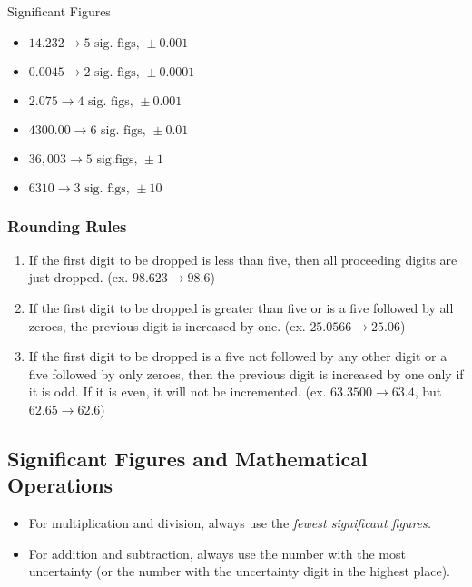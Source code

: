\noindent
{}

\begin{example}
Significant Figures
\begin{itemize}
	\item $14.232 \rightarrow 5 \text{ sig. figs, } \pm 0.001$
	\item $0.0045 \rightarrow 2 \text{ sig. figs, } \pm 0.0001$
	\item $2.075 \rightarrow 4 \text{ sig. figs, } \pm 0.001$
	\item $4300.00 \rightarrow 6 \text{ sig. figs, } \pm 0.01$
	\item $36,003 \rightarrow 5 \text{ sig.figs, } \pm 1$
	\item $6310 \rightarrow 3 \text{ sig. figs, } \pm 10$
\end{itemize}
\end{example}

\subsubsection{Rounding Rules}

\begin{enumerate}
	\item If the first digit to be dropped is less than five, then all proceeding digits are just dropped. (ex. $98.623 \rightarrow 98.6$)
	\item If the first digit to be dropped is greater than five or is a five followed by all zeroes, the previous digit is increased by one. (ex. $25.0566 \rightarrow 25.06$)
	\item If the first digit to be dropped is a five not followed by any other digit or a five followed by only zeroes, then the previous digit is increased by one only if it is odd. If it is even, it will not be incremented. (ex. $63.3500 \rightarrow 63.4$, but $62.65 \rightarrow 62.6$)
\end{enumerate}

\subsection{Significant Figures and Mathematical Operations}

\begin{itemize}
	\item For multiplication and division, always use the \textit{fewest significant figures.}
	\item For addition and subtraction, always use the number with the most uncertainty (or the number with the uncertainty digit in the highest place).
\end{itemize}

